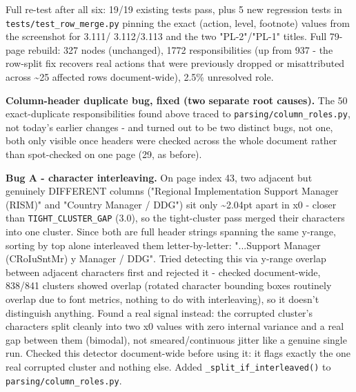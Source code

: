 Full re-test after all six: 19/19 existing tests pass, plus 5 new regression tests in \texttt{tests/\allowbreak{}test\_\allowbreak{}row\_\allowbreak{}merge.py} pinning the exact (action, level, footnote) values from the screenshot for 3.111/ 3.112/3.113 and the two "PL-2"/"PL-1" titles. Full 79-page rebuild: 327 nodes (unchanged), 1772 responsibilities (up from 937 - the row-split fix recovers real actions that were previously dropped or misattributed across \textasciitilde{}25 affected rows document-wide), 2.5\% unresolved role.

\textbf{Column-header duplicate bug, fixed (two separate root causes).} The 50 exact-duplicate responsibilities found above traced to \texttt{parsing/\allowbreak{}column\_\allowbreak{}roles.py}, not today's earlier changes - and turned out to be two distinct bugs, not one, both only visible once headers were checked across the whole document rather than spot-checked on one page (29, as before).

\textbf{Bug A - character interleaving.} On page index 43, two adjacent but genuinely DIFFERENT columns ("Regional Implementation Support Manager (RISM)" and "Country Manager / DDG") sit only \textasciitilde{}2.04pt apart in x0 - closer than \texttt{TIGHT\_\allowbreak{}CLUSTER\_\allowbreak{}GAP} (3.0), so the tight-cluster pass merged their characters into one cluster. Since both are full header strings spanning the same y-range, sorting by top alone interleaved them letter-by-letter: "...Support Manager (CRoIuSntMr) y Manager / DDG". Tried detecting this via y-range overlap between adjacent characters first and rejected it - checked document-wide, 838/841 clusters showed overlap (rotated character bounding boxes routinely overlap due to font metrics, nothing to do with interleaving), so it doesn't distinguish anything. Found a real signal instead: the corrupted cluster's characters split cleanly into two x0 values with zero internal variance and a real gap between them (bimodal), not smeared/continuous jitter like a genuine single run. Checked this detector document-wide before using it: it flags exactly the one real corrupted cluster and nothing else. Added \texttt{\_\allowbreak{}split\_\allowbreak{}if\_\allowbreak{}interleaved()} to \texttt{parsing/\allowbreak{}column\_\allowbreak{}roles.py}.

